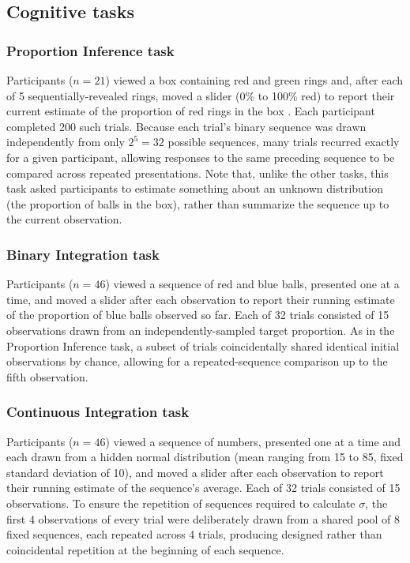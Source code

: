 \documentclass[12pt]{article}
\begin{document}
\subsection{Cognitive tasks}

\subsubsection*{Proportion Inference task}
Participants ($n=21$) viewed a box containing red and green rings and, after each of 5 sequentially-revealed rings, moved a slider (0\% to 100\% red) to report their current estimate of the proportion of red rings in the box \cite{prat2024imprecise}. Each participant completed 200 such trials. Because each trial's binary sequence was drawn independently from only $2^5=32$ possible sequences, many trials recurred exactly for a given participant, allowing responses to the same preceding sequence to be compared across repeated presentations. Note that, unlike the other tasks, this task asked participants to estimate something about an unknown distribution (the proportion of balls in the box), rather than summarize the sequence up to the current observation.

\subsubsection*{Binary Integration task}
Participants ($n=46$) viewed a sequence of red and blue balls, presented one at a time, and moved a slider after each observation to report their running estimate of the proportion of blue balls observed so far. Each of 32 trials consisted of 15 observations drawn from an independently-sampled target proportion. As in the Proportion Inference task, a subset of trials coincidentally shared identical initial observations by chance, allowing for a repeated-sequence comparison up to the fifth observation.

\subsubsection*{Continuous Integration task}
Participants ($n=46$) viewed a sequence of numbers, presented one at a time and each drawn from a hidden normal distribution (mean ranging from 15 to 85, fixed standard deviation of 10), and moved a slider after each observation to report their running estimate of the sequence's average. Each of 32 trials consisted of 15 observations. To ensure the repetition of sequences required to calculate $\sigma$, the first 4 observations of every trial were deliberately drawn from a shared pool of 8 fixed sequences, each repeated across 4 trials, producing designed rather than coincidental repetition at the beginning of each sequence.
\end{document}
